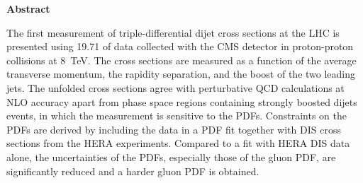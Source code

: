 \thispagestyle{plain}
\begin{center}
    \LARGE{\textbf{Abstract}}\\[2em]
\end{center}
    \normalsize
    The first measurement of triple-differential dijet cross sections at the LHC
    is presented using \SI{19.71}{\fbinv} of data collected with the CMS
    detector in proton-proton collisions at \SI{8}{\TeV}. The cross sections are
    measured as a function of the average transverse momentum, the rapidity
    separation, and the boost of the two leading jets. The unfolded cross
    sections agree with perturbative QCD calculations at NLO accuracy apart from
    phase space regions containing strongly boosted dijets events, in which the
    measurement is sensitive to the PDFs.  Constraints on the PDFs are derived
    by including the data in a PDF fit together with DIS cross sections from the
    HERA experiments. Compared to a fit with HERA DIS data alone, the
    uncertainties of the PDFs, especially those of the gluon PDF, are
    significantly reduced and a harder gluon PDF is obtained.
    \vspace{1ex}


\cleardoublepage

